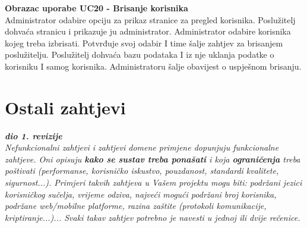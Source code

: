 				\eject
				
				
				\textbf{\large Obrazac uporabe UC20 - Brisanje korisnika}\\
				
				Administrator odabire opciju za prikaz stranice za pregled korisnika. Poslužitelj dohvaća stranicu i prikazuje ju administrator. Administrator odabire korisnika kojeg treba izbrisati. Potvrđuje svoj odabir I time šalje zahtjev za brisanjem poslužitelju. Poslužitelj dohvaća bazu podataka I iz nje uklanja podatke o korisniku I samog korisnika. Administratoru šalje obavijest o uspješnom brisanju.

				\eject
	
		\section{Ostali zahtjevi}
		
			\textbf{\textit{dio 1. revizije}}\\
		 
			 \textit{Nefunkcionalni zahtjevi i zahtjevi domene primjene dopunjuju funkcionalne zahtjeve. Oni opisuju \textbf{kako se sustav treba ponašati} i koja \textbf{ograničenja} treba poštivati (performanse, korisničko iskustvo, pouzdanost, standardi kvalitete, sigurnost...). Primjeri takvih zahtjeva u Vašem projektu mogu biti: podržani jezici korisničkog sučelja, vrijeme odziva, najveći mogući podržani broj korisnika, podržane web/mobilne platforme, razina zaštite (protokoli komunikacije, kriptiranje...)... Svaki takav zahtjev potrebno je navesti u jednoj ili dvije rečenice.}
			 
			 
			 
	